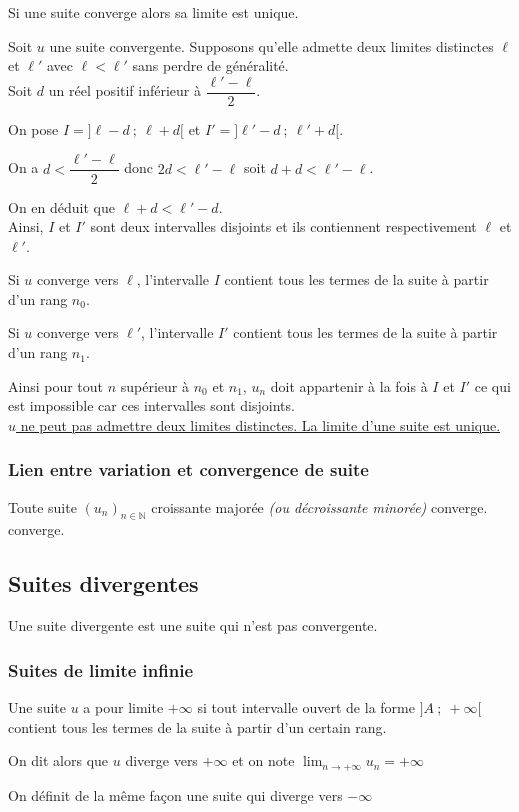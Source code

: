 \documentclass[french]{book}
\newcommand{\N}{\mathbb {N}}
\newcommand{\limn}{\lim_{n\rightarrow +\infty}}
\newcommand{\suite}[1][u]{\left( #1_{n} \right)_{n\in\N}}
\begin{document}
\vspace{2ex}
\begin{prop}
Si une suite converge alors sa limite est unique.
\end{prop}

\begin{demo}
Soit $u$ une suite convergente. Supposons qu'elle admette deux limites distinctes $\ell$ et $\ell'$ avec $\ell<\ell'$ sans perdre de généralité.\\

Soit $d$ un réel positif inférieur à $\dfrac{\ell'-\ell}{2}$.

On pose $I=]\ell-d~;~\ell+d[$ et $I'=]\ell'-d~;~\ell'+d[$.

On a $d<\dfrac{\ell'-\ell}{2}$ donc $2d<\ell'-\ell$ soit $d+d<\ell'-\ell$.

On en déduit que $\ell+d<\ell'-d$.\\

Ainsi, $I$ et $I'$ sont deux intervalles disjoints et ils contiennent respectivement $\ell$ et $\ell'$.

Si $u$ converge vers $\ell$, l'intervalle $I$ contient tous les termes de la suite à partir d'un rang $n_{0}$.

Si $u$ converge vers $\ell'$, l'intervalle $I'$ contient tous les termes de la suite à partir d'un rang $n_{1}$.

Ainsi pour tout $n$ supérieur à $n_{0}$ et $n_{1}$, $u_{n}$ doit appartenir à la fois à $I$ et $I'$ ce qui est impossible car ces intervalles sont disjoints. \\

\underline{ $u$ ne peut pas admettre deux limites distinctes. La limite d'une suite est unique.}
\end{demo}

\subsubsection{Lien entre variation et convergence de suite}
\begin{thm}
Toute suite $ \suite[u]$ croissante majorée \emph{(ou décroissante minorée)} converge.
converge.
\end{thm}
\newpage

\subsection{Suites divergentes}
Une suite divergente est une suite qui n'est pas convergente.
\subsubsection*{Suites de limite infinie}
\begin{defn}
Une suite $u$ a pour limite $+\infty$ si tout intervalle ouvert de la forme $]A~;~+\infty[$ contient tous les termes de la suite à partir d'un certain rang.
\par On dit alors que $u$ diverge vers $+\infty$ et on note $\limn u_{n}=+\infty$
\par On définit de la même façon une suite qui diverge vers $-\infty$
\end{defn}
\end{document}
